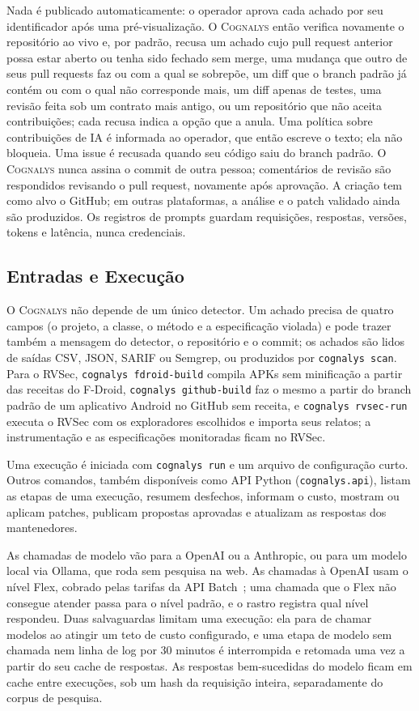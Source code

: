 \documentclass[conference]{IEEEtran}
\newcommand{\system}{\textsc{Cognalys}}
\begin{document}
Nada é publicado automaticamente: o operador aprova cada achado por seu
identificador após uma pré-visualização. O \system{} então verifica novamente o
repositório ao vivo e, por padrão, recusa um achado cujo pull request anterior
possa estar aberto ou tenha sido fechado sem merge, uma mudança que outro de
seus pull requests faz ou com a qual se sobrepõe, um diff que o branch
padrão já contém ou com o qual não corresponde mais, um diff apenas de testes,
uma revisão feita sob um contrato mais antigo, ou um repositório que não aceita
contribuições; cada recusa indica a opção que a anula. Uma política sobre
contribuições de IA é informada ao operador, que então escreve o texto; ela não
bloqueia. Uma issue é recusada quando seu código saiu do branch padrão. O
\system{} nunca assina o commit de outra pessoa; comentários de revisão são
respondidos revisando o pull request, novamente após aprovação. A criação tem
como alvo o GitHub; em outras plataformas, a análise e o patch validado ainda
são produzidos. Os registros de prompts guardam requisições, respostas,
versões, tokens e latência, nunca credenciais.

\subsection{Entradas e Execução}

O \system{} não depende de um único detector. Um achado precisa de quatro campos
(o projeto, a classe, o método e a especificação violada) e pode trazer também a
mensagem do detector, o repositório e o commit; os achados são lidos de saídas
CSV, JSON, SARIF ou Semgrep, ou produzidos por \texttt{cognalys scan}. Para o
RVSec, \texttt{cognalys fdroid-build} compila APKs sem minificação a partir das
receitas do F-Droid, \texttt{cognalys github-build} faz o mesmo a partir do
branch padrão de um aplicativo Android no GitHub sem receita, e
\texttt{cognalys rvsec-run} executa o RVSec com os exploradores escolhidos e
importa seus relatos; a instrumentação e as
especificações monitoradas ficam no RVSec.

Uma execução é iniciada com \texttt{cognalys run} e um arquivo de configuração
curto. Outros comandos, também disponíveis como API Python
(\texttt{cognalys.api}), listam as etapas de uma execução, resumem desfechos,
informam o custo, mostram ou aplicam patches, publicam propostas aprovadas e
atualizam as respostas dos mantenedores.

As chamadas de modelo vão para a OpenAI ou a Anthropic, ou para um modelo local
via Ollama, que roda sem pesquisa na web. As chamadas à OpenAI usam o nível Flex,
cobrado pelas tarifas da API Batch~\cite{openai2026flex}; uma chamada que o Flex não consegue atender passa
para o nível padrão, e o rastro registra qual nível respondeu. Duas
salvaguardas limitam uma execução: ela para de chamar modelos ao atingir um
teto de custo configurado, e uma etapa de modelo sem chamada nem linha de log
por 30 minutos é interrompida e retomada uma vez a partir do seu cache de
respostas. As respostas bem-sucedidas do modelo ficam em cache entre execuções,
sob um hash da requisição inteira, separadamente do corpus de pesquisa.
\end{document}
